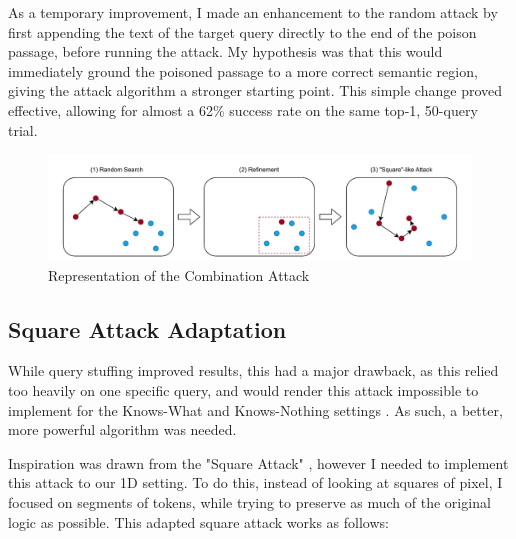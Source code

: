 \documentclass[a4paper, sigconf]{acmart}
\begin{document}
As a temporary improvement, I made an enhancement to the random attack by first appending the text of the target query directly to the end of the poison passage, before running the attack. My hypothesis was that this would immediately ground the poisoned passage to a more correct semantic region, giving the attack algorithm a stronger starting point. This simple change proved effective, allowing for almost a 62\% success rate on the same top-1, 50-query trial. 


\begin{figure}
  \centering
  \includegraphics[width=\textwidth]{combi_attack.pdf}
  \caption{Representation of the Combination Attack}
  \label{fig:combi}
\end{figure}


\subsection{Square Attack Adaptation}

While query stuffing improved results, this had a major drawback, as this relied too heavily on one specific query, and would render this attack impossible to implement for the Knows-What and Knows-Nothing settings \cite{bentov2024}. As such, a better, more powerful algorithm was needed. 

Inspiration was drawn from the "Square Attack" \cite{andriushchenko2020}, however I needed to implement this attack to our 1D setting. To do this, instead of looking at squares of pixel, I focused on segments of tokens, while trying to preserve as much of the original logic as possible. This adapted square attack works as follows:
\end{document}
